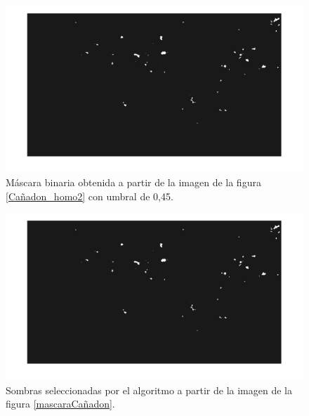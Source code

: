 \begin{figure}[h!]
    \includegraphics[width=\textwidth]{Imagenes/Homomorfico/DJI_340_bin.png}
     \hfill
     \caption{Máscara binaria obtenida a partir de la imagen de la figura \ref{Cañadon_homo2} con umbral de 0,45.}
    \label{mascaraCañadon2}
\end{figure}

\begin{figure}[h!]
    \includegraphics[width=\textwidth]{Imagenes/Homomorfico/DJI_340_bin.png}
     \hfill
     \caption{Sombras seleccionadas por el algoritmo a partir de la imagen de la figura \ref{mascaraCañadon}.}
    \label{seleccionadaCañadon2}
\end{figure}